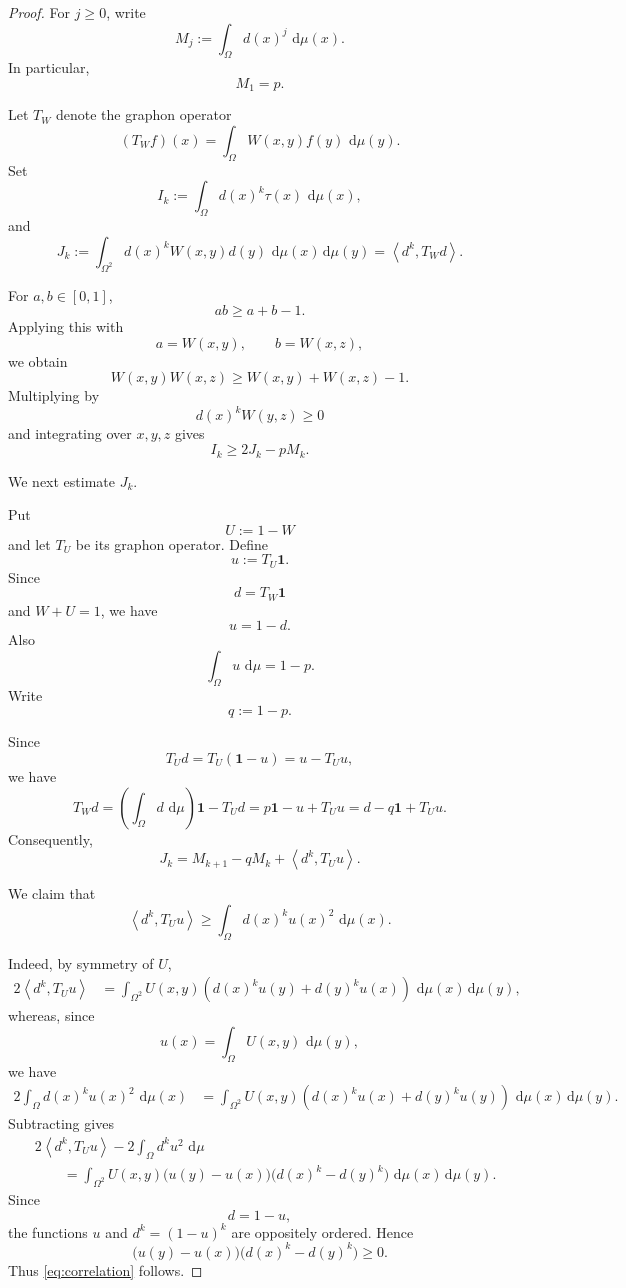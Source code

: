 \documentclass[11pt]{article}
\newcommand{\1}{\mathbf{1}}
\newcommand{\ip}[2]{\left\langle #1,#2\right\rangle}
\newcommand{\dd}{\,\mathrm{d}}
\begin{document}
\begin{proof}
For $j\ge0$, write
\[
M_j:=\int_\Omega d(x)^j\,\dd\mu(x).
\]
In particular,
\[
M_1=p.
\]

Let $T_W$ denote the graphon operator
\[
(T_Wf)(x)
=
\int_\Omega W(x,y)f(y)\,\dd\mu(y).
\]
Set
\[
I_k
:=
\int_\Omega d(x)^k\tau(x)\,\dd\mu(x),
\]
and
\[
J_k
:=
\int_{\Omega^2}
d(x)^kW(x,y)d(y)
\,\dd\mu(x)\dd\mu(y)
=
\ip{d^k}{T_Wd}.
\]

For $a,b\in[0,1]$,
\[
ab\ge a+b-1.
\]
Applying this with
\[
a=W(x,y),\qquad b=W(x,z),
\]
we obtain
\[
W(x,y)W(x,z)
\ge
W(x,y)+W(x,z)-1.
\]
Multiplying by
\[
d(x)^kW(y,z)\ge0
\]
and integrating over $x,y,z$ gives
\[
I_k\ge 2J_k-pM_k.
\tag{3.1}
\label{eq:Ik-Jk}
\]

We next estimate $J_k$.

Put
\[
U:=1-W
\]
and let $T_U$ be its graphon operator.  Define
\[
u:=T_U\1.
\]
Since
\[
d=T_W\1
\]
and $W+U=1$, we have
\[
u=1-d.
\]
Also
\[
\int_\Omega u\,\dd\mu
=
1-p.
\]
Write
\[
q:=1-p.
\]

Since
\[
T_Ud=T_U(\1-u)=u-T_Uu,
\]
we have
\[
T_Wd
=
\left(\int_\Omega d\,\dd\mu\right)\1-T_Ud
=
p\1-u+T_Uu
=
d-q\1+T_Uu.
\]
Consequently,
\begin{equation}
J_k
=
M_{k+1}-qM_k+\ip{d^k}{T_Uu}.
\tag{3.2}
\label{eq:Jk-decomp}
\end{equation}

We claim that
\begin{equation}
\ip{d^k}{T_Uu}
\ge
\int_\Omega d(x)^ku(x)^2\,\dd\mu(x).
\tag{3.3}
\label{eq:correlation}
\end{equation}

Indeed, by symmetry of $U$,
\begin{align*}
2\ip{d^k}{T_Uu}
&=
\int_{\Omega^2}
U(x,y)
\left(
d(x)^ku(y)+d(y)^ku(x)
\right)
\,\dd\mu(x)\dd\mu(y),
\end{align*}
whereas, since
\[
u(x)=\int_\Omega U(x,y)\,\dd\mu(y),
\]
we have
\begin{align*}
2\int_\Omega d(x)^ku(x)^2\,\dd\mu(x)
&=
\int_{\Omega^2}
U(x,y)
\left(
d(x)^ku(x)+d(y)^ku(y)
\right)
\,\dd\mu(x)\dd\mu(y).
\end{align*}
Subtracting gives
\begin{align*}
&2\ip{d^k}{T_Uu}
-
2\int_\Omega d^ku^2\,\dd\mu
\\
&\qquad=
\int_{\Omega^2}
U(x,y)
\bigl(u(y)-u(x)\bigr)
\bigl(d(x)^k-d(y)^k\bigr)
\,\dd\mu(x)\dd\mu(y).
\end{align*}
Since
\[
d=1-u,
\]
the functions $u$ and $d^k=(1-u)^k$ are oppositely ordered.
Hence
\[
\bigl(u(y)-u(x)\bigr)
\bigl(d(x)^k-d(y)^k\bigr)\ge0.
\]
Thus \eqref{eq:correlation} follows.


\end{proof}
\end{document}
